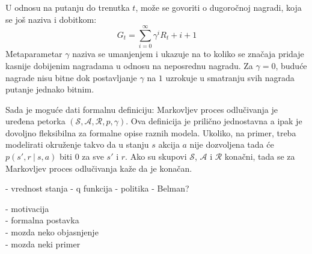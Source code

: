U odnosu na putanju do trenutka $t$, može se govoriti o dugoročnoj nagradi, koja se još naziva i dobitkom:
\begin{equation}
	G_t = \sum_{i=0}^{\infty} \gamma^iR_t+i+1
\end{equation}
Metaparametar $\gamma$ naziva se umanjenjem i ukazuje na to koliko se značaja pridaje kasnije dobijenim nagradama u odnosu na neposrednu nagradu. Za $\gamma = 0$, buduće nagrade nisu bitne dok postavljanje $\gamma$ na $1$ uzrokuje u smatranju svih nagrada putanje jednako bitnim.
\par 
Sada je moguće dati formalnu definiciju: Markovljev proces odlučivanja je uređena petorka $(\mathcal{S}, \mathcal{A}, \mathcal{R}, p, \gamma)$. Ova definicija je prilično jednostavna a ipak je dovoljno fleksibilna za formalne opise raznih modela. Ukoliko, na primer, treba modelirati okruženje takvo da u stanju $s$ akcija $a$ nije dozvoljena tada će $p(s', r ~|~ s, a)$ biti $0$ za sve $s'$ i $r$. Ako su skupovi $\mathcal{S}$, $\mathcal{A}$ i $\mathcal{R}$ konačni, tada se za Markovljev proces odlučivanja kaže da je konačan.
\par 
- vrednost stanja
- q funkcija
- politika
- Belman?


- motivacija \\
- formalna postavka \\
- mozda neko objasnjenje \\
- mozda neki primer \\